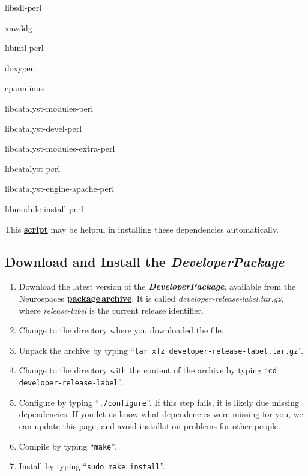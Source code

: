 \documentclass[12pt]{article}
\begin{document}
\begin{description}
         \item libsdl-perl
         \item xaw3dg
         \item libintl-perl
         \item doxygen
         \item cpanminus
         \item libcatalyst-modules-perl
         \item libcatalyst-devel-perl
         \item libcatalyst-modules-extra-perl
         \item libcatalyst-perl
         \item libcatalyst-engine-apache-perl
         \item libmodule-install-perl
      \end{description}

This \href{scripts/install-dependencies.sh}{\bf script} may be helpful in installing these dependencies automatically.

\subsection*{Download and Install the {\bf{\emph{DeveloperPackage}}}}

\begin{enumerate}
   \item Download the latest version of the {\bf{\emph{DeveloperPackage}}}, available from the Neurospaces \href{http://repo-genesis3.cbi.utsa.edu/src/}{\bf package\,archive}. It is called {\it developer-release-label.tar.gz}, where {\it release-label} is the current release identifier.
   \item Change to the directory where you downloaded the file.
   \item Unpack the archive by typing ``{\tt tar xfz developer-release-label.tar.gz}''.
   \item Change to the directory with the content of the archive by typing ``{\tt cd developer-release-label}''.
   \item Configure by typing ``{\tt ./configure}''.  If this step fails, it is likely due missing dependencies.  If you let us know what dependencies were missing for you, we can update this page, and avoid installation problems for other people.
   \item Compile by typing ``{\tt make}''.
   \item Install by typing ``{\tt sudo make install}''. 
\end{enumerate}
\end{document}
